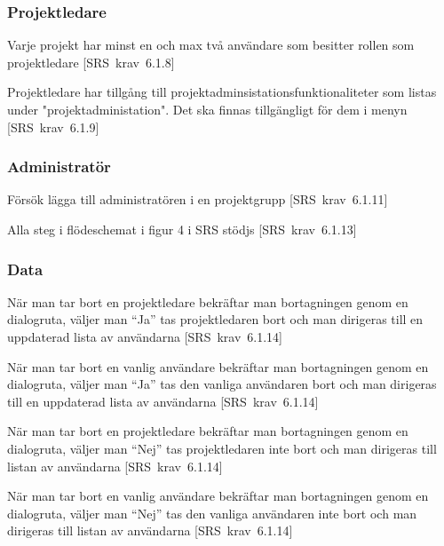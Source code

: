 \documentclass[a4paper]{article}
\def\reqinside{\hfil\penalty 100 \hfilneg \hbox}
\def \req [#1]{\reqinside{[SRS krav #1]}}
\begin{document}
\begin{appendices}
\subsubsection{Projektledare}
\begin{FT}
\item
Varje projekt har minst en och max två användare som besitter rollen som projektledare  \req[6.1.8]

\item
Projektledare har tillgång till projektadminsistationsfunktionaliteter som listas under "projektadministation". Det ska finnas tillgängligt för dem i menyn \req[6.1.9]
\end{FT}

\subsubsection{Administratör}

\begin{FT}
\item
Försök lägga till administratören i en projektgrupp \req[6.1.11]

\item
Alla steg i flödeschemat i figur 4 i SRS stödjs \req[6.1.13]
\end{FT}

\subsubsection{Data}

\begin{FT}
\item När man tar bort en projektledare bekräftar man bortagningen genom en dialogruta, väljer man ``Ja'' tas projektledaren bort och man dirigeras till en uppdaterad lista av användarna \req[6.1.14]

\item När man tar bort en vanlig användare bekräftar man bortagningen genom en dialogruta, väljer man ``Ja'' tas den vanliga användaren bort och man dirigeras till en uppdaterad lista av användarna \req[6.1.14]

\item När man tar bort en projektledare bekräftar man bortagningen genom en dialogruta, väljer man ``Nej'' tas projektledaren inte bort och man dirigeras till listan av användarna \req[6.1.14]

\item När man tar bort en vanlig användare bekräftar man bortagningen genom en dialogruta, väljer man ``Nej'' tas den vanliga användaren inte bort och man dirigeras till listan av användarna \req[6.1.14]
\end{FT}


\end{appendices}
\end{document}
